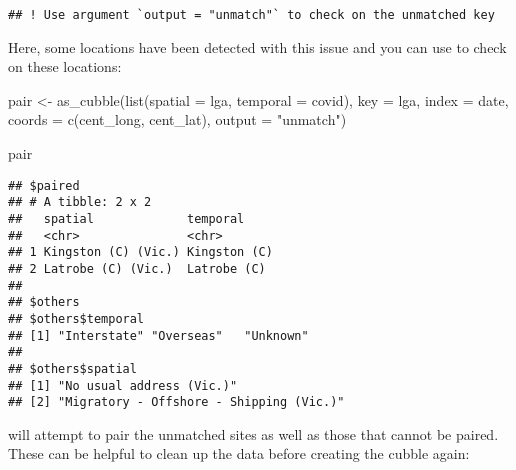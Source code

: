 \documentclass{article}
\newenvironment{Shaded}{\begin{snugshade}}{\end{snugshade}}
\newcommand{\AttributeTok}[1]{\textcolor[rgb]{0.77,0.63,0.00}{#1}}
\newcommand{\FunctionTok}[1]{\textcolor[rgb]{0.00,0.00,0.00}{#1}}
\newcommand{\NormalTok}[1]{#1}
\newcommand{\OtherTok}[1]{\textcolor[rgb]{0.56,0.35,0.01}{#1}}
\newcommand{\StringTok}[1]{\textcolor[rgb]{0.31,0.60,0.02}{#1}}
\begin{document}
\begin{verbatim}
## ! Use argument `output = "unmatch"` to check on the unmatched key
\end{verbatim}

Here, some locations have been detected with this issue and you can use  to check on these locations:

\begin{Shaded}
\begin{Highlighting}[]
\NormalTok{pair }\OtherTok{\textless{}{-}} \FunctionTok{as\_cubble}\NormalTok{(}\FunctionTok{list}\NormalTok{(}\AttributeTok{spatial =}\NormalTok{ lga, }\AttributeTok{temporal =}\NormalTok{ covid),}
                  \AttributeTok{key =}\NormalTok{ lga, }\AttributeTok{index =}\NormalTok{ date, }\AttributeTok{coords =} \FunctionTok{c}\NormalTok{(cent\_long, cent\_lat),}
                  \AttributeTok{output =} \StringTok{"unmatch"}\NormalTok{)}

\NormalTok{pair}
\end{Highlighting}
\end{Shaded}

\begin{verbatim}
## $paired
## # A tibble: 2 x 2
##   spatial             temporal    
##   <chr>               <chr>       
## 1 Kingston (C) (Vic.) Kingston (C)
## 2 Latrobe (C) (Vic.)  Latrobe (C) 
## 
## $others
## $others$temporal
## [1] "Interstate" "Overseas"   "Unknown"   
## 
## $others$spatial
## [1] "No usual address (Vic.)"               
## [2] "Migratory - Offshore - Shipping (Vic.)"
\end{verbatim}

 will attempt to pair the unmatched sites as well as those that cannot be paired. These can be helpful to clean up the data before creating the cubble again:
\end{document}
